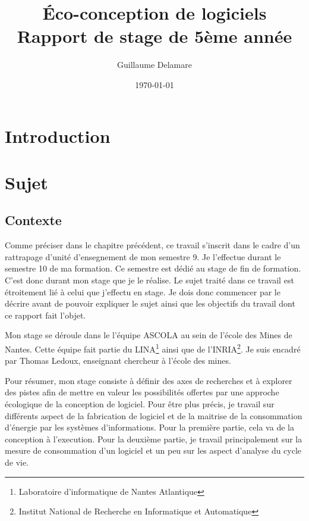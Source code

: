 \documentclass[a4paper, 11pt]{report}
\title{Éco-conception de logiciels\\ \large Rapport de stage de 5ème année}
\author{Guillaume Delamare}
\date{\today}
\begin{document}
\renewcommand{\labelitemi}{$\bullet$}
\renewcommand{\labelitemii}{$\diamond$}
\renewcommand{\labelitemiii}{$\ast$}
\renewcommand{\labelitemiv}{$\cdot$}

\maketitle
\newpage

\tableofcontents

\chapter{Introduction}

\chapter{Sujet}
	\section{Contexte}
Comme préciser dans le chapitre précédent, ce travail s'inscrit dans le cadre d'un rattrapage d'unité d'ensegnement de mon semestre 9. Je l'effectue durant le semestre 10 de ma formation. Ce semestre est dédié au stage de fin de formation. C'est donc durant mon stage que je le réalise. Le sujet traité dans ce travail est étroitement lié à celui que j'effectu en stage. Je dois donc commencer par le décrire avant de pouvoir expliquer le sujet ainsi que les objectifs du travail dont ce rapport fait l'objet.

Mon stage se déroule dans le l'équipe ASCOLA au sein de l'école des Mines de Nantes. Cette équipe fait partie du LINA\footnote{Laboratoire d'informatique de Nantes Atlantique} ainsi que de l'INRIA\footnote{Institut National de Recherche en Informatique et Automatique}. Je suis encadré par Thomas Ledoux, enseignant chercheur à l'école des mines.

Pour résumer, mon stage consiste à définir des axes de recherches et à explorer des pistes afin de mettre en valeur les possibilités offertes par une approche écologique de la conception de logiciel. Pour être plus précis, je travail sur différents aspect de la fabrication de logiciel et de la maitrise de la consommation d'énergie par les systèmes d'informations. Pour la première partie, cela va de la conception à l'execution. Pour la deuxième partie, je travail principalement sur la mesure de consommation d'un logiciel et un peu sur les aspect d'analyse du cycle de vie.
\end{document}
